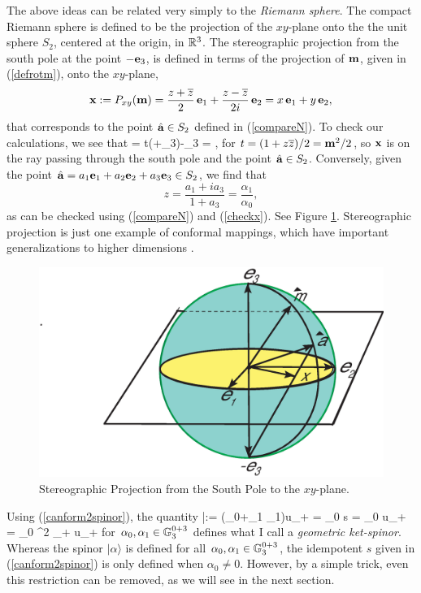\documentclass[]{article}
\begin{document}
 The above ideas can be related very simply to the {\it Riemann sphere}. The compact Riemann sphere is
 defined to be the projection of the $xy$-plane onto the the unit sphere $S_2$, centered at the origin, in $\mathbb{R}^3$.
 The stereographic projection from the south pole at the point $-\mathbf{e}_3$, is defined in terms of the projection of $\mathbf{m}$, given in (\ref{defrotm}), onto
 the $xy$-plane, 
 \[ \mathbf{x}:=P_{xy} (\mathbf{m}) =  \frac{z+\overline z}{2}\,\mathbf{e}_1+\frac{z-\overline z}{2i}\,\mathbf{e}_2=
             x\, \mathbf{e}_1+ y\, \mathbf{e}_2, \]
 that corresponds to the point $\hat {\mathbf{a}} \in S_2$ defined in (\ref{compareN}). To check our calculations, we see that
 \beq \bx = t(\hat \ba+\be_3)-\be_3 \quad \iff \quad \bm= , \label{checkx} \eeq
 for $t=(1+z\overline z)/2= \mathbf{m}^2/2$, so $\mathbf{x}$ is on the ray passing through the south pole and the point $\hat {\mathbf{a}} \in S_2$. Conversely, given
 the point $\hat {\mathbf{a}}=a_1 \mathbf{e}_1+a_2 \mathbf{e}_2+a_3 \mathbf{e}_3\in S_2$, we find that
 \[ z = \frac{a_1+i a_3}{1+a_3}=\frac{\alpha_1}{\alpha_0}, \]
 as can be checked using (\ref{compareN}) and (\ref{checkx}). See Figure \ref{sterox}. Stereographic projection is
 just one example of conformal mappings, which have important generalizations to higher dimensions \cite{Sob2012}. 
  
 \begin{figure}
\begin{center}
\no\includegraphics[scale=.35]{steroproje.eps}
\caption{Stereographic Projection from the South Pole to the $xy$-plane. }
\label{sterox}
\end{center}
\end{figure}
Using (\ref{canform2spinor}), the quantity
   \beq |\alpha\rangle:= (\alpha_0+\alpha_1 \be_1)u_+ =
    \alpha_0 s = \alpha_0 \bm u_+ =  \alpha_0 \bm^2 \hat \ba_+ u_+ \label{spinrep} \eeq 
for $\alpha_0,\alpha_1\in \mathbb{G}_3^{0+3}$ defines what I call a {\it geometric ket-spinor}.
Whereas the spinor $|\alpha \rangle$ is defined for all $\alpha_0,\alpha_1 \in \mathbb{G}_3^{0+3}$,
the idempotent $s$ given in (\ref{canform2spinor}) is only defined when $\alpha_0 \ne 0$. 
However, by a simple trick, even this restriction can be removed, as we will see in the next section.
\end{document}
